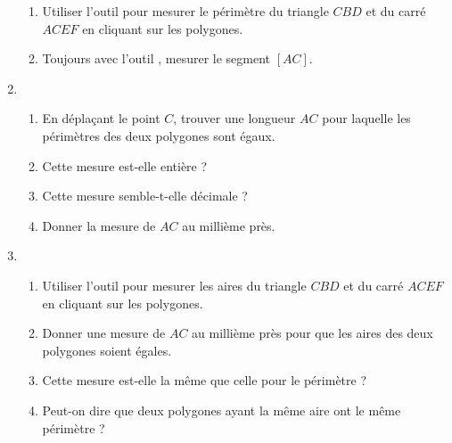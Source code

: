 \begin{enumerate}
\begin{enumerate}
        \item Utiliser l'outil \glength{} pour mesurer le périmètre du triangle $CBD$ et du carré $ACEF$ en cliquant sur les polygones.
        \item Toujours avec l'outil \glength{}, mesurer le segment $[AC]$.
    \end{enumerate}
    \item \begin{enumerate}
        \item En déplaçant le point $C$, trouver une longueur $AC$ pour laquelle les périmètres des deux polygones sont égaux.
        \item Cette mesure est-elle entière ?
        \item Cette mesure semble-t-elle décimale ? 
        \item Donner la mesure de $AC$ au millième près.
    \end{enumerate}
    \item \begin{enumerate}
        \item Utiliser l'outil \garea{} pour mesurer les aires du triangle $CBD$ et du carré $ACEF$ en cliquant sur les polygones.
        \item Donner une mesure de $AC$ au millième près pour que les aires des deux polygones soient égales.
        \item Cette mesure est-elle la même que celle pour le périmètre ?
        \item Peut-on dire que deux polygones ayant la même aire ont le même périmètre ?
    \end{enumerate}
\end{enumerate}
